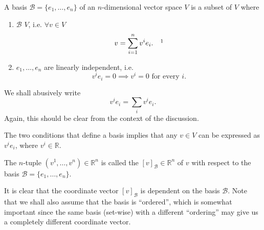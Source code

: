 \documentclass[notoc,notitlepage]{tufte-book}
\begin{document}
\begin{defn}[Basis]\label{defn:basis}
  A basis $\mathcal{B} = \{ e_1, \ldots, e_n \}$ of an $n$-dimensional vector space $V$ is a subset of $V$ where
  \begin{enumerate}
    \item $\mathcal{B}$  $V$, i.e. $\forall v \in V$
      \begin{equation*}
        v = \sum_{i=1}^{n} v^i e_i. \quad \footnotemark
      \end{equation*}
    \item $e_1, \ldots, e_n$ are linearly independent, i.e.
      \begin{equation*}
        v^i e_i = 0 \implies v^i = 0 \text{ for every } i.
      \end{equation*}
  \end{enumerate}
\end{defn}

\begin{note}
  We shall abusively write
  \begin{equation*}
    v^i e_i = \sum_{i} v^i e_i.
  \end{equation*}
  Again, this should be clear from the context of the discussion.
\end{note}

The two conditions that define a basis implies that any $v \in V$ can be expressed as $v^i e_i$, where $v^i \in \mathbb{R}$.

\begin{defn}\label{defn:coordinate_vector}
  The $n$-tuple $(v^1, \ldots, v^n) \in \mathbb{R}^n$ is called the  $[v]_{\mathcal{B}} \in \mathbb{R}^n$ of $v$ with respect to the basis $\mathcal{B} = \{ e_1, \ldots, e_n \}$.
\end{defn}

\begin{note}
  It is clear that the coordinate vector $[v]_{\mathcal{B}}$ is dependent on the basis $\mathcal{B}$. Note that we shall also assume that the basis is ``ordered'', which is somewhat important since the same basis (set-wise) with a different ``ordering'' may give us a completely different coordinate vector.
\end{note}
\end{document}
